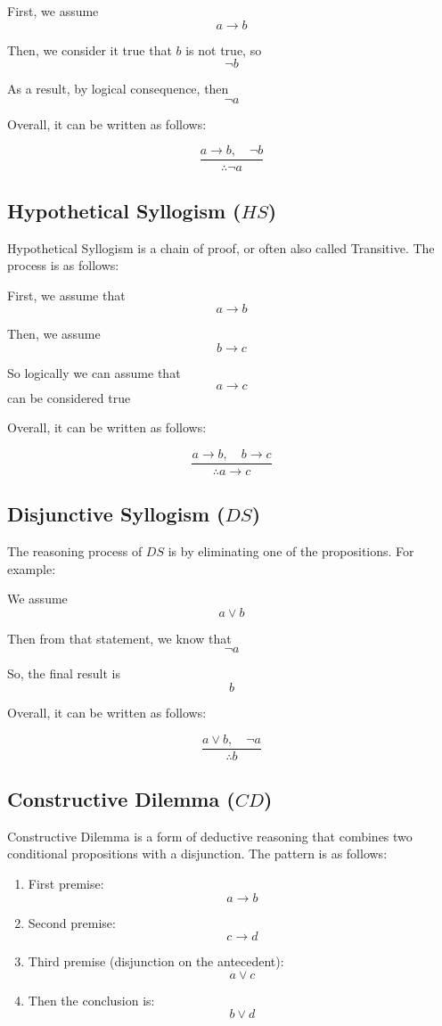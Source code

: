 \documentclass[12pt,a4paper,openany]{article}
\begin{document}
First, we assume \[a \to b\]

Then, we consider it true that \(b\) is not true, so \[\neg b\]

As a result, by logical consequence, then \[\neg a\]

Overall, it can be written as follows:

\[\frac{a \to b, \quad \neg b}{\therefore \neg a}\]

\subsection{Hypothetical Syllogism (\(HS\))}\label{hypothetical-syllogism-hs}

Hypothetical Syllogism is a chain of proof, or often also called Transitive. The process is as follows:

First, we assume that \[a \to b\]

Then, we assume \[b \to c\]

So logically we can assume that \[a \to c\] can be considered true

Overall, it can be written as follows:

\[\frac{a \to b, \quad b \to c}{\therefore a \to c}\]

\subsection{Disjunctive Syllogism (\(DS\))}\label{disjunctive-syllogism-ds}

The reasoning process of \(DS\) is by eliminating one of the propositions. For example:

We assume \[a \lor b\]

Then from that statement, we know that \[\neg a\]

So, the final result is \[b\]

Overall, it can be written as follows:

\[\frac{a \lor b, \quad \neg a}{\therefore b}\]

\subsection{Constructive Dilemma (\(CD\))}\label{constructive-dilemma-cd}

Constructive Dilemma is a form of deductive reasoning that combines two conditional propositions with a disjunction. The pattern is as follows:

\begin{enumerate}
\item First premise:
  \[a \to b\]
\item Second premise:
  \[c \to d\]
\item Third premise (disjunction on the antecedent):
  \[a \lor c\]
\item Then the conclusion is:
  \[b \lor d\]
\end{enumerate}
\end{document}
